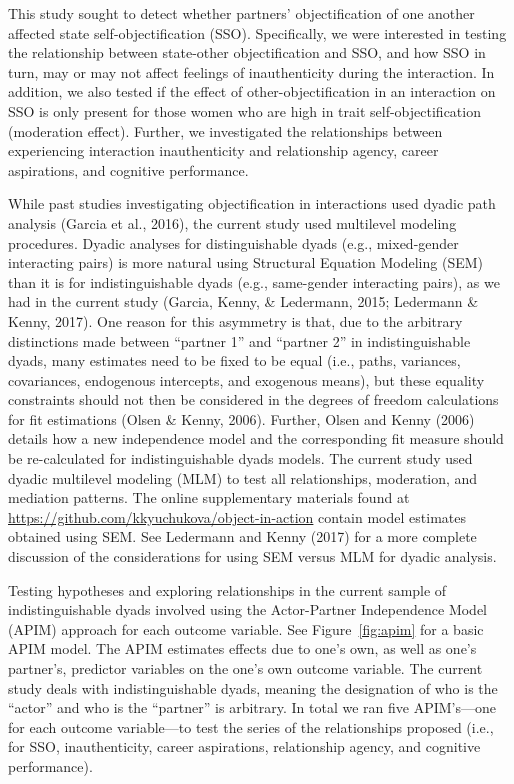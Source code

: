 \documentclass[man]{apa6}
\begin{document}
This study sought to detect whether partners' objectification of one
another affected state self-objectification (SSO). Specifically, we were
interested in testing the relationship between state-other
objectification and SSO, and how SSO in turn, may or may not affect
feelings of inauthenticity during the interaction. In addition, we also
tested if the effect of other-objectification in an interaction on SSO
is only present for those women who are high in trait
self-objectification (moderation effect). Further, we investigated the
relationships between experiencing interaction inauthenticity and
relationship agency, career aspirations, and cognitive performance.

While past studies investigating objectification in interactions used
dyadic path analysis (Garcia et al., 2016), the current study used
multilevel modeling procedures. Dyadic analyses for distinguishable
dyads (e.g., mixed-gender interacting pairs) is more natural using
Structural Equation Modeling (SEM) than it is for indistinguishable
dyads (e.g., same-gender interacting pairs), as we had in the current
study (Garcia, Kenny, \& Ledermann, 2015; Ledermann \& Kenny, 2017). One
reason for this asymmetry is that, due to the arbitrary distinctions
made between \enquote{partner 1} and \enquote{partner 2} in
indistinguishable dyads, many estimates need to be fixed to be equal
(i.e., paths, variances, covariances, endogenous intercepts, and
exogenous means), but these equality constraints should not then be
considered in the degrees of freedom calculations for fit estimations
(Olsen \& Kenny, 2006). Further, Olsen and Kenny (2006) details how a
new independence model and the corresponding fit measure should be
re-calculated for indistinguishable dyads models. The current study used
dyadic multilevel modeling (MLM) to test all relationships, moderation,
and mediation patterns. The online supplementary materials found at
\url{https://github.com/kkyuchukova/object-in-action} contain model
estimates obtained using SEM. See Ledermann and Kenny (2017) for a more
complete discussion of the considerations for using SEM versus MLM for
dyadic analysis.

Testing hypotheses and exploring relationships in the current sample of
indistinguishable dyads involved using the Actor-Partner Independence
Model (APIM) approach for each outcome variable. See
Figure~\ref{fig:apim} for a basic APIM model. The APIM estimates effects
due to one's own, as well as one's partner's, predictor variables on the
one's own outcome variable. The current study deals with
indistinguishable dyads, meaning the designation of who is the
\enquote{actor} and who is the \enquote{partner} is arbitrary. In total
we ran five APIM's---one for each outcome variable---to test the series
of the relationships proposed (i.e., for SSO, inauthenticity, career
aspirations, relationship agency, and cognitive performance).
\end{document}

